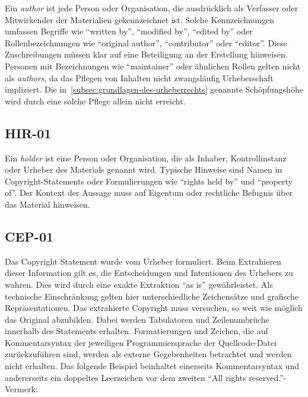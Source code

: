 Ein \textit{author} ist jede Person oder Organisation, die ausdrücklich als Verfasser oder Mitwirkender der Materialien gekennzeichnet ist.
Solche Kennzeichnungen umfassen Begriffe wie \enquote{written by}, \enquote{modified by}, \enquote{edited by} oder Rollenbezeichnungen wie \enquote{original author}, \enquote{contributor} oder \enquote{editor}.
Diese Zuschreibungen müssen klar auf eine Beteiligung an der Erstellung hinweisen.
Personen mit Bezeichnungen wie \enquote{maintainer} oder ähnlichen Rollen gelten nicht als \textit{authors}, da das Pflegen von Inhalten nicht zwangsläufig Urheberschaft impliziert.
Die in~\ref{subsec:grundlagen-des-urheberrechts} genannte Schöpfungshöhe wird durch eine solche Pflege allein nicht erreicht.


\subsection{HIR-01}\label{subsec:hir-01}

Ein \textit{holder} ist eine Person oder Organisation, die als Inhaber, Kontrollinstanz oder Urheber des Materials genannt wird.
Typische Hinweise sind Namen in Copyright-Statements oder Formulierungen wie \enquote{rights held by} und \enquote{property of}.
Der Kontext der Aussage muss auf Eigentum oder rechtliche Befugnis über das Material hinweisen.


\subsection{CEP-01}\label{subsec:cep-01}

Das Copyright Statement wurde vom Urheber formuliert.
Beim Extrahieren dieser Information gilt es, die Entscheidungen und Intentionen des Urhebers zu wahren.
Dies wird durch eine exakte Extraktion \enquote{as is} gewährleistet.
Als technische Einschränkung gelten hier unterschiedliche Zeichensätze und grafische Repräsentationen.
Das extrahierte Copyright muss versuchen, so weit wie möglich das Original abzubilden.
Dabei werden Tabulatoren und Zeilenumbrüche innerhalb des Statements erhalten.
Formatierungen und Zeichen, die auf Kommentarsyntax der jeweiligen Programmiersprache der Quellcode-Datei zurückzuführen sind, werden als externe Gegebenheiten betrachtet und werden nicht erhalten.
Das folgende Beispiel beinhaltet einerseits Kommentarsyntax und andererseits ein doppeltes Leerzeichen vor dem zweiten \enquote{All rights reserved.}-Vermerk:

